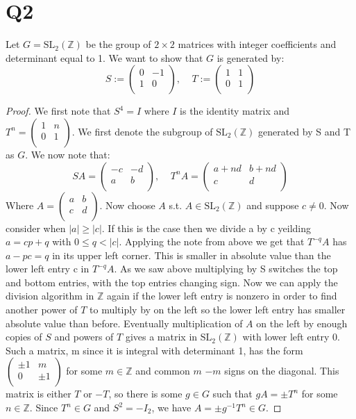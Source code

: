 \documentclass{article}
\begin{document}
\section*{Q2}
Let $G = \text{SL}_2(\mathbb{Z})$ be the group of $2 \times 2$ matrices with integer coefficients and determinant equal to 1. We want to show that $G$ is generated by:
$$S:=\begin{pmatrix}
0 & -1\\
1 & 0\\
\end{pmatrix}, \;\;\;\;T:=\begin{pmatrix}
1 & 1\\
0 & 1\\
\end{pmatrix}$$
\begin{proof}
We first note that $S^4=I$ where $I$ is the identity matrix and $T^n=\begin{pmatrix}
1 & n\\
0 & 1\\
\end{pmatrix}$.
We first denote the subgroup of $\text{SL}_2(\mathbb{Z})$ generated by S and T as $G$. We now note that:
$$SA=\begin{pmatrix}
-c & -d\\
a & b\\
\end{pmatrix}, \;\;\;\;T^nA=\begin{pmatrix}
a+nd & b+nd\\
c & d\\
\end{pmatrix}$$
Where $A=\begin{pmatrix}
a & b\\
c & d\\
\end{pmatrix}$. Now choose $A$ s.t. $A\in\text{SL}_2(\mathbb{Z})$ and suppose $c\neq0$. Now consider when $|a| \geq |c|$. If this is the case then we divide a by c yeilding $a = cp + q$ with $0 \leq q < |c|$. Applying the note from above we get that $T^{-q} A$ has $a - pc = q$ in its upper left corner. This is smaller in absolute value than the lower left entry c in $T^{-q}A$. As we saw above multiplying by S switches the top and bottom entries, with the top entries changing sign. Now we can apply the division algorithm in $\mathbb{Z}$ again if the lower left entry is nonzero in order to find another power of $T$ to multiply by on the left so the lower left entry has smaller absolute value than before. Eventually multiplication of $A$ on the left by enough copies of $S$ and powers of $T$ gives a matrix in $\text{SL}_2 (\mathbb{Z})$ with lower left entry 0. Such a matrix, m since it is integral with determinant 1, has the form $\begin{pmatrix} 
\pm 1 & m\\
0 & \pm 1\\
\end{pmatrix}$ for some $m \in \mathbb{Z}$ and common $m$ $-m$ signs on the diagonal. This matrix is either $T$ or $-T$, so there is some $g\in G$ such that $gA = \pm T^n$ for some $n\in\mathbb{Z}$. Since $T^n\in G$ and $S^2=-I_2$, we have $A=\pm g^{-1}T^n\in G$.
\end{proof}
\end{document}
